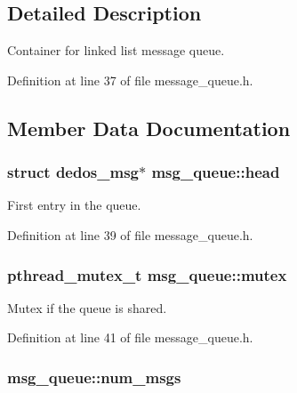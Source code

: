 \subsection{Detailed Description}
Container for linked list message queue. 

Definition at line 37 of file message\-\_\-queue.\-h.



\subsection{Member Data Documentation}
\hypertarget{structmsg__queue_a66440959ccc8955eae8594a9674511cc}{
\subsubsection[{head}]{\setlength{\rightskip}{0pt plus 5cm}struct {\bf dedos\-\_\-msg}$\ast$ msg\-\_\-queue\-::head}}\label{structmsg__queue_a66440959ccc8955eae8594a9674511cc}


First entry in the queue. 



Definition at line 39 of file message\-\_\-queue.\-h.

\hypertarget{structmsg__queue_a5218b92f916543130a579ecf1523ad82}{
\subsubsection[{mutex}]{\setlength{\rightskip}{0pt plus 5cm}pthread\-\_\-mutex\-\_\-t msg\-\_\-queue\-::mutex}}\label{structmsg__queue_a5218b92f916543130a579ecf1523ad82}


Mutex if the queue is shared. 



Definition at line 41 of file message\-\_\-queue.\-h.

\hypertarget{structmsg__queue_a91a341ed44388ff02304c1165b698372}{
\subsubsection[{num\-\_\-msgs}]{ msg\-\_\-queue\-::num\-\_\-msgs}}\label{structmsg__queue_a91a341ed44388ff02304c1165b698372}


